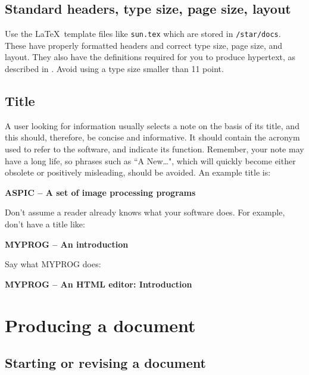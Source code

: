 \documentclass[twoside,11pt,nolof]{starlink}
\begin{document}
\subsection{Standard headers, type size, page size, layout}

Use the \LaTeX\ template files like \texttt{sun.tex} which are stored in
\texttt{/star/docs}.
These have properly formatted headers and correct type size, page size, and
layout.
They also have the definitions required for you to produce hypertext, as
described in .
Avoid using a type size smaller than 11 point.

\subsection{Title}

A user looking for information usually selects a note on the basis of its title,
and this should, therefore, be concise and informative.
It should contain the acronym used to refer to the software, and indicate its
function.
Remember, your note may have a long life, so phrases such as ``A New\ldots",
which will quickly become either obsolete or positively misleading, should be
avoided.
An example title is:

\begin{center}
\textbf{ASPIC -- A set of image processing programs}
\end{center}

Don't assume a reader already knows what your software does.
For example, don't have a title like:

\begin{center}
\textbf{MYPROG -- An introduction}
\end{center}

Say what MYPROG does:

\begin{center}
\textbf{MYPROG -- An HTML editor: Introduction}
\end{center}

\newpage

\section{Producing a document}

\subsection{Starting or revising a document}
\end{document}
